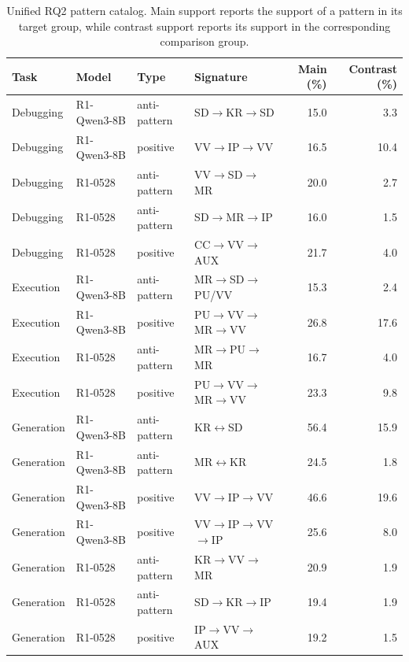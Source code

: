 \begin{table}[t]
\centering
\caption{Unified RQ2 pattern catalog. Main support reports the support of a pattern in its target group, while contrast support reports its support in the corresponding comparison group.}
\label{tab:rq2-pattern-catalog}
\footnotesize
\setlength{\tabcolsep}{5pt}
\renewcommand{\arraystretch}{1.15}
\begin{tabular}{llllrr}
\toprule
Task & Model & Type & Signature & Main (\%) & Contrast (\%) \\
\midrule
Debugging & R1-Qwen3-8B & anti-pattern & SD$\rightarrow$KR$\rightarrow$SD & 15.0 & 3.3 \\
Debugging & R1-Qwen3-8B & positive & VV$\rightarrow$IP$\rightarrow$VV & 16.5 & 10.4 \\
Debugging & R1-0528 & anti-pattern & VV$\rightarrow$SD$\rightarrow$MR & 20.0 & 2.7 \\
Debugging & R1-0528 & anti-pattern & SD$\rightarrow$MR$\rightarrow$IP & 16.0 & 1.5 \\
Debugging & R1-0528 & positive & CC$\rightarrow$VV$\rightarrow$AUX & 21.7 & 4.0 \\
Execution & R1-Qwen3-8B & anti-pattern & MR$\rightarrow$SD$\rightarrow$PU/VV & 15.3 & 2.4 \\
Execution & R1-Qwen3-8B & positive & PU$\rightarrow$VV$\rightarrow$MR$\rightarrow$VV & 26.8 & 17.6 \\
Execution & R1-0528 & anti-pattern & MR$\rightarrow$PU$\rightarrow$MR & 16.7 & 4.0 \\
Execution & R1-0528 & positive & PU$\rightarrow$VV$\rightarrow$MR$\rightarrow$VV & 23.3 & 9.8 \\
Generation & R1-Qwen3-8B & anti-pattern & KR$\leftrightarrow$SD & 56.4 & 15.9 \\
Generation & R1-Qwen3-8B & anti-pattern & MR$\leftrightarrow$KR & 24.5 & 1.8 \\
Generation & R1-Qwen3-8B & positive & VV$\rightarrow$IP$\rightarrow$VV & 46.6 & 19.6 \\
Generation & R1-Qwen3-8B & positive & VV$\rightarrow$IP$\rightarrow$VV$\rightarrow$IP & 25.6 & 8.0 \\
Generation & R1-0528 & anti-pattern & KR$\rightarrow$VV$\rightarrow$MR & 20.9 & 1.9 \\
Generation & R1-0528 & anti-pattern & SD$\rightarrow$KR$\rightarrow$IP & 19.4 & 1.9 \\
Generation & R1-0528 & positive & IP$\rightarrow$VV$\rightarrow$AUX & 19.2 & 1.5 \\

\end{tabular}
\end{table}
